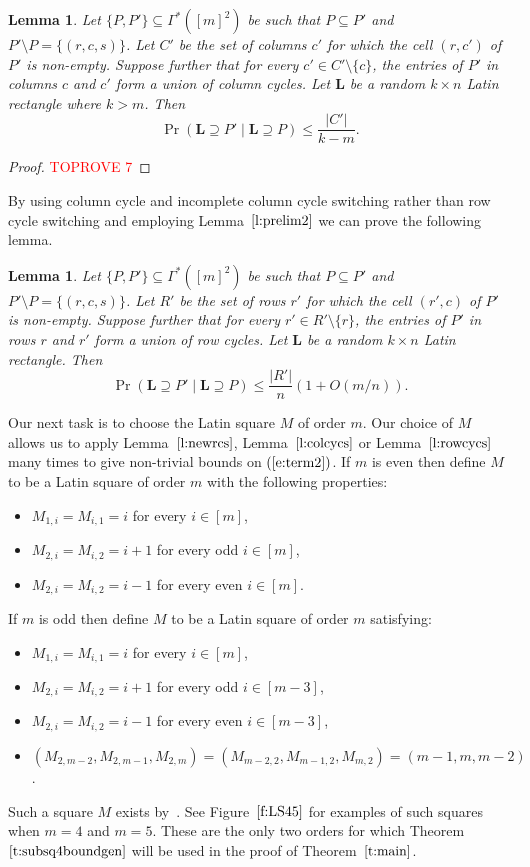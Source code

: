 \documentclass[12pt]{article}
\newtheorem{lem}[thm]{Lemma}
\theoremstyle{definition}
\numberwithin{equation}{section}
\def\eref#1{$(\ref{#1})$}
\def\lref#1{Lemma~$\ref{#1}$}
\def\tref#1{Theorem~$\ref{#1}$}
\def\fref#1{Figure~$\ref{#1}$}
\renewcommand{\leq}{\leqslant}
\renewcommand{\L}{\mathbf{L}}
\begin{document}
	\begin{lem}\label{l:colcycs}
		Let $\{P, P'\} \subseteq \Gamma^*([m]^2)$ be such that $P \subseteq
		P'$ and $P' \setminus P = \{(r, c, s)\}$. Let $C'$ be the set of
		columns $c'$ for which the cell $(r, c')$ of $P'$ is
		non-empty. Suppose further that for every $c' \in C'\setminus\{c\}$,
		the entries of $P'$ in columns $c$ and $c'$ form a
		union of column cycles. Let $\L$ be a random $k \times n$ Latin
		rectangle where $k>m$. Then
		\[
		\Pr(\L \supseteq P' \mid  \L \supseteq P) \leq \frac{|C'|}{k-m}.
		\]
	\end{lem}
	
	\begin{proof}\textcolor{red}{TOPROVE 7}\end{proof}
	
	By using column cycle and incomplete column cycle switching rather
	than row cycle switching and employing \lref{l:prelim2} we can prove
	the following lemma.
	
	\begin{lem}\label{l:rowcycs}
		Let $\{P, P'\} \subseteq \Gamma^*([m]^2)$ be such that $P \subseteq
		P'$ and $P' \setminus P = \{(r, c, s)\}$. Let $R'$ be the set of
		rows $r'$ for which the cell $(r', c)$ of $P'$ is non-empty. Suppose
		further that for every $r' \in R' \setminus \{r\}$, the entries of
		$P'$ in rows $r$ and $r'$ form a union of row cycles. Let $\L$ be a
		random $k \times n$ Latin rectangle. Then
		\[
		\Pr(\L \supseteq P' \mid  \L \supseteq P) \leq \frac{|R'|}n(1+O(m/n)).
		\]
	\end{lem}
	
	Our next task is to choose the Latin square $M$ of order $m$. Our
	choice of $M$ allows us to apply \lref{l:newrcs}, \lref{l:colcycs} or
	\lref{l:rowcycs} many times to give non-trivial bounds on
	\eref{e:term2}. If $m$ is even then define $M$ to be a Latin square of
	order $m$ with the following properties:
	\begin{itemize}
		\item $M_{1, i} = M_{i, 1} = i$ for every $i \in [m]$,
		\item $M_{2, i} = M_{i, 2} = i+1$ for every odd $i \in [m]$,
		\item $M_{2, i} = M_{i, 2} = i-1$ for every even $i \in [m]$.
	\end{itemize}
	If $m$ is odd then define $M$ to be a Latin square of order $m$ satisfying:
	\begin{itemize}
		\item $M_{1, i} = M_{i, 1} = i$ for every $i \in [m]$, 
		\item $M_{2, i} = M_{i, 2} = i+1$ for every odd $i \in [m-3]$,
		\item $M_{2, i} = M_{i, 2} = i-1$ for every even $i \in [m-3]$,
		\item $(M_{2, m-2}, M_{2, m-1}, M_{2, m}) = (M_{m-2, 2}, M_{m-1, 2}, M_{m, 2}) = (m-1, m, m-2)$.
	\end{itemize}
	Such a square $M$ exists
	by~\cite[Theorem~$1.5$]{2rows2cols}. See \fref{f:LS45} 
	for examples of such squares when $m=4$ and $m=5$. These are the only
	two orders for which \tref{t:subsq4boundgen} will be used
	in the proof of \tref{t:main}.
	
\end{document}
